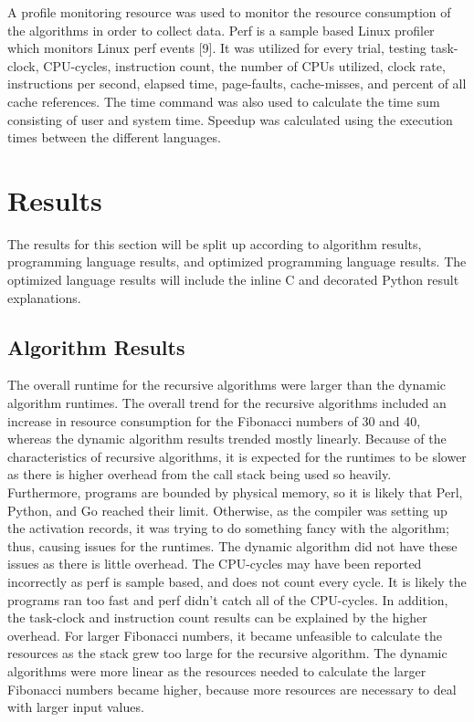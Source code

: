 \documentclass{sig-alternate}
\begin{document}
A profile monitoring resource was used to monitor the resource consumption of the algorithms in order to collect data. Perf is a sample based Linux profiler which monitors Linux perf events [9]. It was utilized for every trial, testing task-clock, CPU-cycles, instruction count, the number of CPUs utilized, clock rate, instructions per second, elapsed time, page-faults, cache-misses, and percent of all cache references. The time command was also used to calculate the time sum consisting of user and system time. Speedup was calculated using the execution times between the different languages.

\section{Results}

The results for this section will be split up according to algorithm results, programming language results, and optimized programming language results. The optimized language results will include the inline C and decorated Python result explanations.

\subsection{Algorithm Results}

The overall runtime for the recursive algorithms were larger than the dynamic algorithm runtimes. The overall trend for the recursive algorithms included an increase in resource consumption for the Fibonacci numbers of 30 and 40, whereas the dynamic algorithm results trended mostly linearly. Because of the characteristics of recursive algorithms, it is expected for the runtimes to be slower as there is higher overhead from the call stack being used so heavily. Furthermore, programs are bounded by physical memory, so it is likely that Perl, Python, and Go reached their limit. Otherwise, as the compiler was setting up the activation records, it was trying to do something fancy with the algorithm; thus, causing issues for the runtimes. The dynamic algorithm did not have these issues as there is little overhead. The CPU-cycles may have been reported incorrectly as perf is sample based, and does not count every cycle. It is likely the programs ran too fast and perf didn’t catch all of the CPU-cycles. In addition, the task-clock and instruction count results can be explained by the higher overhead. For larger Fibonacci numbers, it became unfeasible to calculate the resources as the stack grew too large for the recursive algorithm. The dynamic algorithms were more linear as the resources needed to calculate the larger Fibonacci numbers became higher, because more resources are necessary to deal with larger input values.
\end{document}
